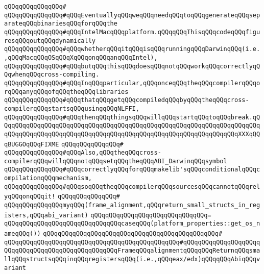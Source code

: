 \verb|qQQqqQQqqQQqqQQq#|\newline
\verb|qQQqqQQqqQQqqQQq#qQQqEventuallyqQQqweqQQqneedqQQqtoqQQqgenerateqQQqseparateqQQqbinariesqQQqforqQQqthe|\newline
\verb|qQQqqQQqqQQqqQQq#qQQqIntelMacqQQqplatform.qQQqqQQqThisqQQqcodeqQQqfiguresqQQqoutqQQqdynamically|\newline
\verb|qQQqqQQqqQQqqQQq#qQQqwhetherqQQqitqQQqisqQQqrunningqQQqDarwinqQQq(i.e.,qQQqMacqQQqOSqQQqXqQQqonqQQqanqQQqIntel),|\newline
\verb|qQQqqQQqqQQqqQQq#qQQqbutqQQqthisqQQqdoesqQQqnotqQQqworkqQQqcorrectlyqQQqwhenqQQqcross-compiling.|\newline
\verb|qQQqqQQqqQQqqQQq#qQQqInqQQqparticular,qQQqonceqQQqtheqQQqcompilerqQQqorqQQqanyqQQqofqQQqtheqQQqlibraries|\newline
\verb|qQQqqQQqqQQqqQQq#qQQqthatqQQqgetqQQqcompiledqQQqbyqQQqtheqQQqcross-compilerqQQqstartsqQQqusingqQQqNLFFI,|\newline
\verb|qQQqqQQqqQQqqQQq#qQQqthenqQQqthingsqQQqwillqQQqstartqQQqtoqQQqbreak.qQQqqQQqqQQqqQQqqQQqqQQqqQQqqQQqqQQqqQQqqQQqqQQqqQQqqQQqqQQqqQQqqQQqqQQqqQQqqQQqqQQqqQQqqQQqqQQqqQQqqQQqqQQqqQQqqQQqqQQqqQQqqQQqqQQqqQQqXXXqQQqBUGGOqQQqFIXME|\newline
\verb|qQQqqQQqqQQqqQQq#|\newline
\verb|qQQqqQQqqQQqqQQq#qQQqAlso,qQQqtheqQQqcross-compilerqQQqwillqQQqnotqQQqsetqQQqtheqQQqABI_DarwinqQQqsymbol|\newline
\verb|qQQqqQQqqQQqqQQq#qQQqcorrectlyqQQqforqQQqmakelib'sqQQqconditionalqQQqcompilationqQQqmechanism,|\newline
\verb|qQQqqQQqqQQqqQQq#qQQqsoqQQqtheqQQqcompilerqQQqsourcesqQQqcannotqQQqrelyqQQqonqQQqit!|\newline
\verb|qQQqqQQqqQQqqQQq#|\newline
\verb|qQQqqQQqqQQqqQQqmyqQQq(frame_alignment,qQQqreturn_small_structs_in_registers,qQQqabi_variant)|\newline
\verb|qQQqqQQqqQQqqQQqqQQqqQQqqQQqqQQq=|\newline
\verb|qQQqqQQqqQQqqQQqqQQqqQQqqQQqqQQqcaseqQQq(platform_properties::get_os_nameqQQq())|\newline
\verb|qQQqqQQqqQQqqQQqqQQqqQQqqQQqqQQqqQQqqQQqqQQqqQQq#|\newline
\verb|qQQqqQQqqQQqqQQqqQQqqQQqqQQqqQQqqQQqqQQqqQQqqQQq#qQQqqQQqqQQqqQQqqQQqqQQqqQQqqQQqqQQqqQQqqQQqqQQqqQQqFrameqQQqalignmentqQQqqQQqReturnqQQqsmallqQQqstructsqQQqinqQQqregistersqQQq(i.e.,qQQqeax/edx)qQQqqQQqAbiqQQqvariant|\newline
